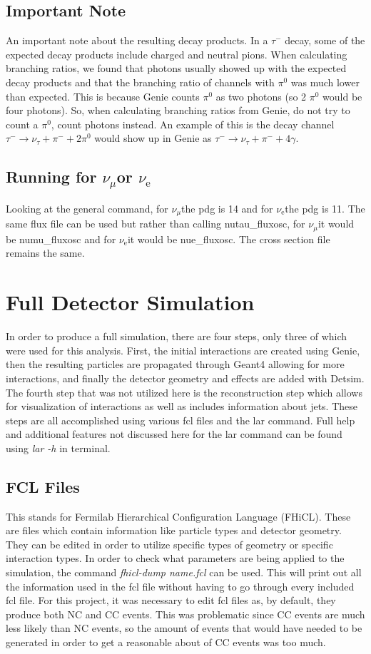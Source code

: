 \documentclass{article}
\newcommand{\nue}{$\nu_{\text{e}}$\space}
\newcommand{\numu}{$\nu_{\mu}$\space}
\begin{document}
\subsection{Important Note}
An important note about the resulting decay products. In a $\tau^-$ decay, some of the expected decay products include charged and neutral pions. When calculating branching ratios, we found that photons usually showed up with the expected decay products and that the branching ratio of channels with $\pi^0$ was much lower than expected. This is because Genie counts $\pi^0$ as two photons (so 2 $\pi^0$ would be four photons). So, when calculating branching ratios from Genie, do not try to count a $\pi^0$, count photons instead. An example of this is the decay channel $\tau^-\to\nu_\tau+\pi^-+2\pi^0$ would show up in Genie as $\tau^-\to\nu_\tau+\pi^-+4\gamma$.

\subsection{Running for \numu or \nue}
Looking at the general command, for \numu the pdg is 14 and for \nue the pdg is 11. The same flux file can be used but rather than calling nutau\_fluxosc, for \numu it would be numu\_fluxosc and for \nue it would be nue\_fluxosc. The cross section file remains the same. 

\section{Full Detector Simulation}
In order to produce a full simulation, there are four steps, only three of which were used for this analysis. First, the initial interactions are created using Genie, then the resulting particles are propagated through Geant4 allowing for more interactions, and finally the detector geometry and effects are added with Detsim. The fourth step that was not utilized here is the reconstruction step which allows for visualization of interactions as well as includes information about jets. These steps are all accomplished using various fcl files and the lar command. Full help and additional features not discussed here for the lar command can be found using \textit{lar -h} in terminal. 

\subsection{FCL Files}
This stands for Fermilab Hierarchical Configuration Language (FHiCL). These are files which contain information like particle types and detector geometry. They can be edited in order to utilize specific types of geometry or specific interaction types. In order to check what parameters are being applied to the simulation, the command \textit{fhicl-dump name.fcl} can be used. This will print out all the information used in the fcl file without having to go through every included fcl file. For this project, it was necessary to edit fcl files as, by default, they produce both NC and CC events. This was problematic since CC events are much less likely than NC events, so the amount of events that would have needed to be generated in order to get a reasonable about of CC events was too much. 
\end{document}
